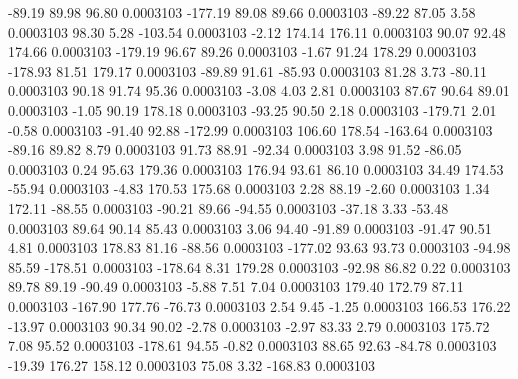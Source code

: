       -89.19       89.98       96.80     0.0003103
     -177.19       89.08       89.66     0.0003103
      -89.22       87.05        3.58     0.0003103
       98.30        5.28     -103.54     0.0003103
       -2.12      174.14      176.11     0.0003103
       90.07       92.48      174.66     0.0003103
     -179.19       96.67       89.26     0.0003103
       -1.67       91.24      178.29     0.0003103
     -178.93       81.51      179.17     0.0003103
      -89.89       91.61      -85.93     0.0003103
       81.28        3.73      -80.11     0.0003103
       90.18       91.74       95.36     0.0003103
       -3.08        4.03        2.81     0.0003103
       87.67       90.64       89.01     0.0003103
       -1.05       90.19      178.18     0.0003103
      -93.25       90.50        2.18     0.0003103
     -179.71        2.01       -0.58     0.0003103
      -91.40       92.88     -172.99     0.0003103
      106.60      178.54     -163.64     0.0003103
      -89.16       89.82        8.79     0.0003103
       91.73       88.91      -92.34     0.0003103
        3.98       91.52      -86.05     0.0003103
        0.24       95.63      179.36     0.0003103
      176.94       93.61       86.10     0.0003103
       34.49      174.53      -55.94     0.0003103
       -4.83      170.53      175.68     0.0003103
        2.28       88.19       -2.60     0.0003103
        1.34      172.11      -88.55     0.0003103
      -90.21       89.66      -94.55     0.0003103
      -37.18        3.33      -53.48     0.0003103
       89.64       90.14       85.43     0.0003103
        3.06       94.40      -91.89     0.0003103
      -91.47       90.51        4.81     0.0003103
      178.83       81.16      -88.56     0.0003103
     -177.02       93.63       93.73     0.0003103
      -94.98       85.59     -178.51     0.0003103
     -178.64        8.31      179.28     0.0003103
      -92.98       86.82        0.22     0.0003103
       89.78       89.19      -90.49     0.0003103
       -5.88        7.51        7.04     0.0003103
      179.40      172.79       87.11     0.0003103
     -167.90      177.76      -76.73     0.0003103
        2.54        9.45       -1.25     0.0003103
      166.53      176.22      -13.97     0.0003103
       90.34       90.02       -2.78     0.0003103
       -2.97       83.33        2.79     0.0003103
      175.72        7.08       95.52     0.0003103
     -178.61       94.55       -0.82     0.0003103
       88.65       92.63      -84.78     0.0003103
      -19.39      176.27      158.12     0.0003103
       75.08        3.32     -168.83     0.0003103
